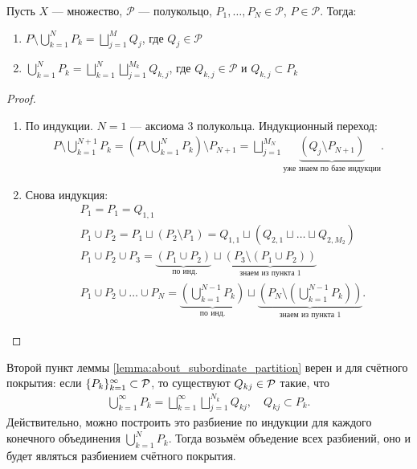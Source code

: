 \documentclass[../measure-theory.tex]{subfiles}
\begin{document}
\begin{lm}
 \label{lemma:about_subordinate_partition}
 Пусть $ X $ --- множество, $ \mathcal{P} $ --- полукольцо, $ P_1, \ldots, P_N \in \mathcal{P} $, $ P \in \mathcal{P} $. Тогда:
 \begin{enumerate}
  \item $ \displaystyle P \setminus \bigcup_{k=1}^N P_k = \bigsqcup_{j=1}^M Q_j $, где $ Q_j \in \mathcal{P} $
  \item $ \displaystyle \bigcup_{k=1}^N P_k = \bigsqcup_{k=1}^N \bigsqcup_{j=1}^{M_k} Q_{k,j} $, где $ Q_{k,j} \in \mathcal{P} $ и $ Q_{k,j} \subset P_k $
 \end{enumerate} 
\end{lm}
\begin{proof}\
 \begin{enumerate}
  \item По индукции. $ N = 1$ --- аксиома 3 полукольца. Индукционный переход:
   \begin{align*}
    P \setminus \bigcup_{k=1}^{N+1} P_k = \left( P \setminus \bigcup_{k=1}^N P_k \right) \setminus P_{N+1} =  \bigsqcup_{j=1}^{M_N} \underbrace{\left( Q_j \setminus P_{N+1} \right)}_{\text{уже знаем по базе индукции}}
   .\end{align*}
  \item Снова индукция:
   \begin{align*}
    &P_1 = P_1 = Q_{1,1} \\
    &P_1 \cup P_2 = P_1 \sqcup (P_2 \setminus P_1) = Q_{1,1} \sqcup (Q_{2,1} \sqcup \ldots \sqcup Q_{2, M_2}) \\
    &P_1 \cup P_2 \cup P_3 = \underbrace{(P_1 \cup P_2)}_{\text{ по инд.}} \sqcup \underbrace{(P_3 \setminus (P_1 \cup P_2))}_{\text{ знаем из пункта 1 }} \\
    &P_1 \cup P_2 \cup \dots \cup P_N = \underbrace{\left(\bigcup_{k = 1}^{N - 1} P_k\right)}_{\text{ по инд. }} \sqcup \underbrace{\left(P_N \setminus \left(\bigcup_{k = 1}^{N - 1} P_k\right)\right)}_{\text{ знаем из пункта 1  } }
   .\end{align*}
 \end{enumerate}
\end{proof}
\begin{remrk}
 Второй пункт леммы \ref{lemma:about_subordinate_partition} верен и для счётного покрытия: если $\{P_{k}\}_{k=1}^{\infty} \subset \mathcal{P} $, то существуют $Q_{kj} \in \mathcal{P}$ такие, что
 \begin{align*}
  \bigcup_{k=1}^{\infty} P_k = \bigsqcup_{k=1}^{\infty} \bigsqcup_{j=1}^{N_k} Q_{kj}, \quad Q_{kj} \subset P_k
 .\end{align*} Действительно, можно построить это разбиение по индукции для каждого конечного объединения $\bigcup_{k=1}^{N} P_k $. Тогда возьмём объедение всех разбиений, оно и будет являться разбиением счётного покрытия. 
\end{remrk}
\end{document}
